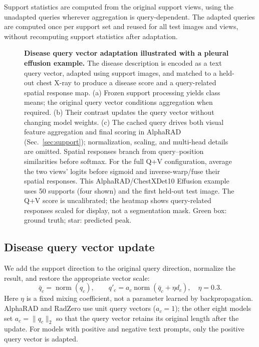 \documentclass[10pt,twocolumn,letterpaper]{article}
\newcommand{\norm}[1]{\operatorname{norm}\!\left(#1\right)}
\begin{document}
Support statistics are computed from the original support views, using the unadapted queries wherever aggregation is query-dependent. The adapted queries are computed once per support set and reused for all test images and views, without recomputing support statistics after adaptation.

\begin{figure}[t]
\centering

\caption{\textbf{Disease query vector adaptation illustrated with a pleural effusion example.} The disease description is encoded as a text query vector, adapted using support images, and matched to a held-out chest X-ray to produce a disease score and a query-related spatial response map. (a) Frozen support processing yields class means; the original query vector conditions aggregation when required. (b) Their contrast updates the query vector without changing model weights. (c) The cached query drives both visual feature aggregation and final scoring in AlphaRAD (Sec.~\ref{sec:support}); normalization, scaling, and multi-head details are omitted. Spatial responses branch from query--position similarities before softmax. For the full Q+V configuration, average the two views' logits before sigmoid and inverse-warp/fuse their spatial responses. This AlphaRAD/ChestXDet10 Effusion example uses 50 supports (four shown) and the first held-out test image. The Q+V score is uncalibrated; the heatmap shows query-related responses scaled for display, not a segmentation mask. Green box: ground truth; star: predicted peak.}
\label{fig:method}
\end{figure}

\subsection{Disease query vector update}
We add the support direction to the original query direction, normalize the result, and restore the appropriate vector scale:
\begin{equation}
\bar q_c=\norm{q_c},\qquad
q'_c=a_c\norm{\bar q_c+\eta d_c},\quad \eta=0.3.
\label{eq:query}
\end{equation}
Here $\eta$ is a fixed mixing coefficient, not a parameter learned by backpropagation. AlphaRAD and RadZero use unit query vectors ($a_c=1$); the other eight models set $a_c=\|q_c\|_2$ so that the query vector retains its original length after the update. For models with positive and negative text prompts, only the positive query vector is adapted.
\end{document}
